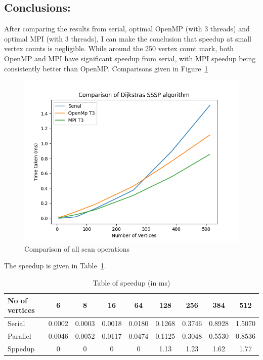 	\subsection{Conclusions:}
	After comparing the results from serial, optimal OpenMP (with 3 threads) and optimal MPI (with 3 threads), I can make the conclusion that speedup at small vertex counts is negligible. While around the 250 vertex count mark, both OpenMP and MPI have significant speedup from serial, with MPI speedup being consistently better than OpenMP.
	Comparisons given in Figure~\ref{fig:fig_sssp_comparison}
	\begin{figure}[!htb]
		\centering
		\includegraphics[width=0.6\linewidth]{sssp_comparison.png}
		\caption{Comparison of all scan operations}
		\label{fig:fig_sssp_comparison}
	\end{figure}

	The speedup is given in Table~\ref{tab:example}.
	\begin{table}[!htb]
		\centering
		\caption{Table of speedup (in ms)}\label{tab:example}
		\begin{tabular}{l|cccccccc}
			\toprule
			No of vertices & 6 & 8 & 16 & 64 & 128 & 256& 384 & 512\\
			\midrule
			Serial &0.0002&0.0003&0.0018&0.0180&0.1268&0.3746&0.8928&1.5070\\
			Parallel &0.0046&0.0052&0.0117&0.0474&0.1125&0.3048&0.5530&0.8536\\
			Sppedup &0&0&0&0&1.13&1.23&1.62&1.77\\
			\bottomrule
		\end{tabular}
	\end{table} 
	
	\newpage
	
	
 

